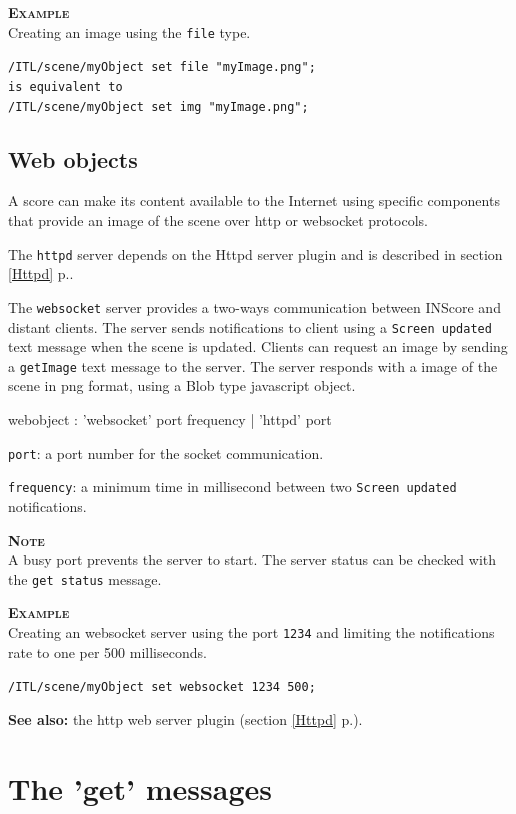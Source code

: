 \documentclass[a4paper,twoside]{report}
\newcommand{\toplevel}[1]	{\chapter{#1}}
\newcommand{\sublevel}[1]	{\section{#1}}
\newcommand{\fullref}[1]	{\ref{#1} p.\pageref{#1}}
\newcommand{\OSC}[1]		{\texttt{#1}}
\newcommand{\example}		{\textbf{\hspace{-1.5cm}\textbf{\textsc{Example }}}}
\newcommand{\note}	[1]		{\vspace{2mm}\textbf{\hspace{-1.03cm}\textbf{\textsc{Note #1}}}}
\renewcommand{\seealso}		{\textbf{See also: }}
\let\olditemize\itemize
\let\oldenditemize\enditemize
\renewenvironment{itemize} 	{\olditemize \setlength{\itemsep}{1mm}}{\oldenditemize}
\newcommand{\sample}	[1]			{\vspace{-2mm}\begin{center}\colorbox{mygrey}{
								\begin{minipage}[t]{0.9\columnwidth} 
								{\small \texttt{#1}}
								\end{minipage}}\end{center}}
\begin{document}
\example \\
Creating an image using the \OSC{file} type.
\sample{/ITL/scene/myObject set file "myImage.png"; \\
\hspace*{4mm} is equivalent to \\
/ITL/scene/myObject set img "myImage.png";
}

\sublevel{Web objects}
\label{webobjects}

A score can make its content available to the Internet using specific components that provide an image of the scene over http or websocket protocols.

The \OSC{httpd} server depends on the Httpd server plugin and is described in section \fullref{Httpd}.

The \OSC{websocket} server provides a two-ways communication between INScore and distant clients. The server sends notifications to client using a \OSC{Screen updated} text message when the scene is updated. Clients can request an image by sending a \OSC{getImage} text message to the server. The server responds with a image of the scene in png format, using a Blob type javascript object.

\begin{rail}
webobject :   'websocket' port frequency
			| 'httpd' port
\end{rail}

\begin{itemize}
\item \OSC{port}: a port number for the socket communication.
\item \OSC{frequency}: a minimum time in millisecond between two \OSC{Screen updated} notifications.
\end{itemize}

\note{} \\
A busy port prevents the server to start. The server status can be checked with the \OSC{get status} message.

\example \\
Creating an websocket server using the port \OSC{1234} and limiting the notifications rate to one per 500 milliseconds.
\sample{/ITL/scene/myObject set websocket 1234 500;}

\seealso the http web server plugin (section \fullref{Httpd}).



\toplevel{The 'get' messages}
\label{getsect}
\end{document}
